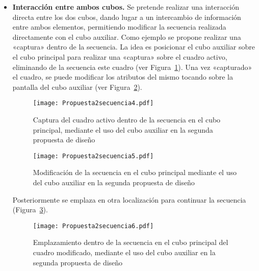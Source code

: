 \begin{itemize}
\item \textbf{Interacción entre ambos cubos.} Se pretende realizar una interacción directa entre los dos cubos, dando lugar a un intercambio de información entre ambos elementos, permitiendo modificar la secuencia realizada directamente con el cubo auxiliar. Como ejemplo se propone realizar una «captura» dentro de la secuencia. La idea es posicionar el cubo auxiliar sobre el cubo principal para realizar una «captura» sobre el cuadro activo, eliminando de la secuencia este cuadro (ver Figura~\ref{fig:Propuesta2secuencia4}). Una vez «capturado» el cuadro, se puede modificar los atributos del mismo tocando sobre la pantalla del cubo auxiliar (ver Figura~\ref{fig:Propuesta2secuencia5}).

\begin{figure}[!h]
\begin{center}
\texttt{[image: Propuesta2secuencia4.pdf]}
\caption{Captura del cuadro activo dentro de la secuencia en el cubo principal, mediante el uso del cubo auxiliar en la segunda propuesta de diseño}
\label{fig:Propuesta2secuencia4}
\end{center}
\end{figure}

\begin{figure}[!h]
\begin{center}
\texttt{[image: Propuesta2secuencia5.pdf]}
\caption{Modificación de la secuencia en el cubo principal mediante el uso del cubo auxiliar en la segunda propuesta de diseño}
\label{fig:Propuesta2secuencia5}
\end{center}
\end{figure}

Posteriormente se emplaza en otra localización para continuar la secuencia (Figura~\ref{fig:Propuesta2secuencia6}).

\begin{figure}[!h]
\begin{center}
\texttt{[image: Propuesta2secuencia6.pdf]}
\caption{Emplazamiento dentro de la secuencia en el cubo principal del cuadro modificado, mediante el uso del cubo auxiliar en la segunda propuesta de diseño}
\label{fig:Propuesta2secuencia6}
\end{center}
\end{figure}

\end{itemize}


